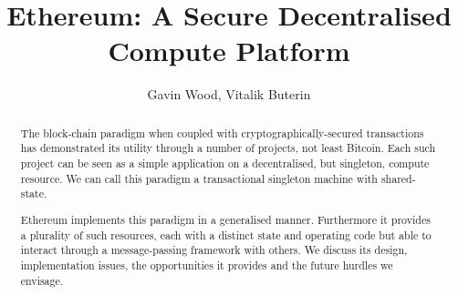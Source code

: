 \documentclass[9pt,oneside]{amsart}
\title{Ethereum: A Secure Decentralised Compute Platform}
\author{Gavin Wood, Vitalik Buterin}
\begin{document}
\begin{abstract}
The block-chain paradigm when coupled with cryptographically-secured transactions has demonstrated its utility through a number of projects, not least Bitcoin. Each such project can be seen as a simple application on a decentralised, but singleton, compute resource. We can call this paradigm a transactional singleton machine with shared-state.

Ethereum implements this paradigm in a generalised manner. Furthermore it provides a plurality of such resources, each with a distinct state and operating code but able to interact through a message-passing framework with others. We discuss its design, implementation issues, the opportunities it provides and the future hurdles we envisage.
\end{abstract}

\maketitle
\end{document}
